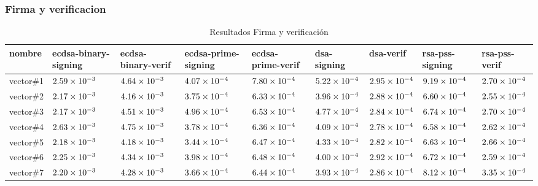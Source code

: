 \documentclass[../main.tex]{subfiles}
\begin{document}
\subsubsection{Firma y verificacion}\label{sec:firma-y-verificacion}
\begin{table*}[]
  \scriptsize
  \centering
  \caption{Resultados Firma y verificación}\label{tab:hash-res}
  \begin{tabular}{|m{1.5cm}<{\centering}|m{1.3cm}<{\centering}|m{1.3cm}<{\centering}|m{1.3cm}<{\centering}|m{1.3cm}<{\centering}|m{1.3cm}<{\centering}|m{1.3cm}<{\centering}|m{1.3cm}<{\centering}|m{1.3cm}<{\centering}|}
    \hline
    \rowcolor[HTML]{000000}
    {\color[HTML]{FFFFFF} nombre} &
  {\color[HTML]{FFFFFF} ecdsa-binary-signing} &
  {\color[HTML]{FFFFFF} ecdsa-binary-verif} &
  {\color[HTML]{FFFFFF} ecdsa-prime-signing} &
  {\color[HTML]{FFFFFF} ecdsa-prime-verif} &
  {\color[HTML]{FFFFFF} dsa-signing} &
  {\color[HTML]{FFFFFF} dsa-verif} &
  {\color[HTML]{FFFFFF} rsa-pss-signing} &
  {\color[HTML]{FFFFFF} rsa-pss-verif} \\ \hline
    vector\#1  & $\num{2.59E-03}$ & $\num{4.64E-03}$ & $\num{4.07E-04}$ & $\num{7.80E-04}$ & $\num{5.22E-04}$ & $\num{2.95E-04}$ & $\num{9.19E-04}$ & $\num{2.70E-04}$ \\ \hline
    \rowcolor[HTML]{C0C0C0}
    vector\#2 & $\num{2.17E-03}$ & $\num{4.16E-03}$ & $\num{3.75E-04}$ & $\num{6.33E-04}$ & $\num{3.96E-04}$ & $\num{2.88E-04}$ & $\num{6.60E-04}$ & $\num{2.55E-04}$ \\ \hline
    vector\#3 & $\num{2.17E-03}$ & $\num{4.51E-03}$ & $\num{4.96E-04}$ & $\num{6.53E-04}$ & $\num{4.77E-04}$ & $\num{2.84E-04}$ & $\num{6.74E-04}$ & $\num{2.70E-04}$ \\ \hline
    \rowcolor[HTML]{C0C0C0}
    vector\#4 & $\num{2.63E-03}$ & $\num{4.75E-03}$ & $\num{3.78E-04}$ & $\num{6.36E-04}$ & $\num{4.09E-04}$ & $\num{2.78E-04}$ & $\num{6.58E-04}$ & $\num{2.62E-04}$ \\ \hline
    vector\#5  & $\num{2.18E-03}$ & $\num{4.18E-03}$ & $\num{3.44E-04}$ & $\num{6.47E-04}$ & $\num{4.33E-04}$ & $\num{2.82E-04}$ & $\num{6.63E-04}$ & $\num{2.66E-04}$ \\ \hline
    \rowcolor[HTML]{C0C0C0}
    vector\#6  & $\num{2.25E-03}$ & $\num{4.34E-03}$ & $\num{3.98E-04}$ & $\num{6.48E-04}$ & $\num{4.00E-04}$ & $\num{2.92E-04}$ & $\num{6.72E-04}$ & $\num{2.59E-04}$ \\ \hline
    vector\#7  & $\num{2.20E-03}$ & $\num{4.28E-03}$ & $\num{3.66E-04}$ & $\num{6.44E-04}$ & $\num{3.93E-04}$ & $\num{2.86E-04}$ & $\num{8.12E-04}$ & $\num{3.35E-04}$ \\ \hline

\end{tabular}
\end{table*}
\end{document}
